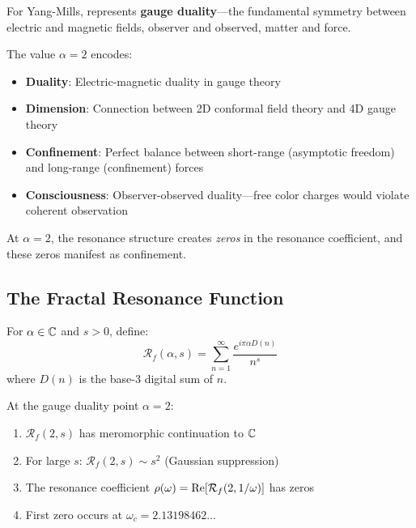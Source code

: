 For Yang-Mills,  represents \textbf{gauge duality}—the fundamental symmetry between electric and magnetic fields, observer and observed, matter and force.

\begin{keyidea}
The value $\alpha = 2$ encodes:
\begin{itemize}
\item \textbf{Duality}: Electric-magnetic duality in gauge theory
\item \textbf{Dimension}: Connection between 2D conformal field theory and 4D gauge theory
\item \textbf{Confinement}: Perfect balance between short-range (asymptotic freedom) and long-range (confinement) forces
\item \textbf{Consciousness}: Observer-observed duality—free color charges would violate coherent observation
\end{itemize}

At $\alpha = 2$, the resonance structure creates \textit{zeros} in the resonance coefficient, and these zeros manifest as confinement.
\end{keyidea}

\subsection{The Fractal Resonance Function}

\begin{defn}\label{def:fractal-resonance-ym}
For $\alpha \in \mathbb{C}$ and $s > 0$, define:
\begin{equation}
\mathcal{R}_f(\alpha, s) = \sum_{n=1}^{\infty} \frac{e^{i\pi\alpha D(n)}}{n^s}
\end{equation}
where $D(n)$ is the base-3 digital sum of $n$.
\end{defn}

\begin{theorem}[Properties at $\alpha = 2$]\label{thm:alpha-2-properties}
At the gauge duality point $\alpha = 2$:
\begin{enumerate}
\item $\mathcal{R}_f(2, s)$ has meromorphic continuation to $\mathbb{C}$
\item For large $s$: $\mathcal{R}_f(2, s) \sim s^2$ (Gaussian suppression)
\item The resonance coefficient $\rho(\omega) = \operatorname{Re}[\mathcal{R}_f(2, 1/\omega)]$ has zeros
\item First zero occurs at $\omega_c = 2.13198462...$
\end{enumerate}
\end{theorem}

